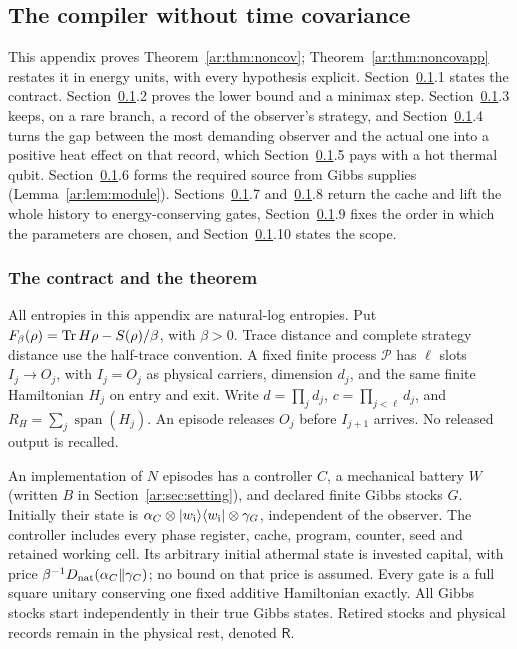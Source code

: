 \subsection{The compiler without time covariance}\label{ar:app:noncov}

This appendix proves Theorem~\ref{ar:thm:noncov}; Theorem~\ref{ar:thm:noncovapp} restates it in energy units, with every hypothesis explicit. Section~\ref{ar:app:noncov}.1 states the contract. Section~\ref{ar:app:noncov}.2 proves the lower bound and a minimax step. Section~\ref{ar:app:noncov}.3 keeps, on a rare branch, a record of the observer's strategy, and Section~\ref{ar:app:noncov}.4 turns the gap between the most demanding observer and the actual one into a positive heat effect on that record, which Section~\ref{ar:app:noncov}.5 pays with a hot thermal qubit. Section~\ref{ar:app:noncov}.6 forms the required source from Gibbs supplies (Lemma~\ref{ar:lem:module}). Sections~\ref{ar:app:noncov}.7 and~\ref{ar:app:noncov}.8 return the cache and lift the whole history to energy-conserving gates, Section~\ref{ar:app:noncov}.9 fixes the order in which the parameters are chosen, and Section~\ref{ar:app:noncov}.10 states the scope.

\subsubsection{The contract and the theorem}
All entropies in this appendix are natural-log entropies. Put
\(F_\beta(\rho)=\operatorname{Tr} H\rho-S(\rho)/\beta\), with \(\beta>0\).
Trace distance and complete strategy distance use the half-trace convention.
A fixed finite process \(\mathcal P\) has \(\ell\) slots
\(I_j\longrightarrow O_j\), with \(I_j=O_j\) as physical carriers,
dimension \(d_j\), and the same finite Hamiltonian \(H_j\) on entry and exit.
Write \(d=\prod_jd_j\), \(c=\prod_{j<\ell}d_j\), and
\(R_H=\sum_j\operatorname{span}(H_j)\). An episode releases \(O_j\) before
\(I_{j+1}\) arrives. No released output is recalled.

An implementation of \(N\) episodes has a controller \(C\), a mechanical
battery \(W\) (written \(B\) in Section~\ref{ar:sec:setting}), and declared finite Gibbs stocks \(G\). Initially their state
is \(\alpha_C\otimes|w_{\rm i}\rangle\langle w_{\rm i}|\otimes\gamma_G\),
independent of the observer. The controller includes every phase register,
cache, program, counter, seed and retained working cell. Its arbitrary
initial athermal state is invested capital, with price
\(\beta^{-1}D_{\mathrm{nat}}(\alpha_C\|\gamma_C)\); no bound on that price is assumed.
Every gate is a full square unitary conserving one fixed additive
Hamiltonian exactly. All Gibbs stocks start independently in their true
Gibbs states. Retired stocks and physical records remain in the physical
rest, denoted \(\mathsf R\).

